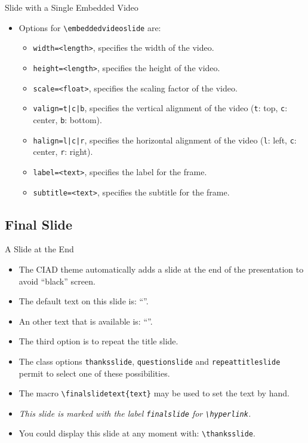 \documentclass[english,sectioncirclenumberstyle]{ciadbeamer}
\begin{document}
\begin{frame}{Slide with a Single Embedded Video \insertcontinuationtext}
	\begin{itemize}
	\item Options for \texttt{{\textbackslash}embeddedvideoslide} are:
		\begin{itemize}
		\item \texttt{width=<length>}, specifies the width of the video.
		\vfill
		\item \texttt{height=<length>}, specifies the height of the video.
		\vfill
		\item \texttt{scale=<float>}, specifies the scaling factor of the video.
		\vfill
		\item \texttt{valign=t|c|b}, specifies the vertical alignment of the video (\texttt{t}: top, \texttt{c}: center, \texttt{b}: bottom).
		\vfill
		\item \texttt{halign=l|c|r}, specifies the horizontal alignment of the video (\texttt{l}: left, \texttt{c}: center, \texttt{r}: right).
		\vfill
		\item \texttt{label=<text>}, specifies the label for the frame.
		\vfill
		\item \texttt{subtitle=<text>}, specifies the subtitle for the frame.
		\end{itemize}
	\end{itemize}
\end{frame}

\subsection{Final Slide}

\begin{frame}{A Slide at the End}
	\begin{itemize}
	\item The CIAD theme automatically adds a slide at the end of the presentation to avoid ``black'' screen.
	\vfill
	\item The default text on this slide is: ``''.
	\item An other text that is available is: ``''.
	\item The third option is to repeat the title slide.
	\vfill
	\item The class options \texttt{thanksslide}, \texttt{questionslide} and \texttt{repeattitleslide} permit to select one of these possibilities.
	\vfill
	\item The macro \texttt{{\textbackslash}finalslidetext\{text\}} may be used to set the text by hand.
	\vfill
	\item \emph{This slide is marked with the label \texttt{finalslide} for \texttt{{\textbackslash}hyperlink}.}
	\vfill
	\item You could display this slide at any moment with: \texttt{{\textbackslash}thanksslide}.
	\end{itemize}
\end{frame}
\end{document}
